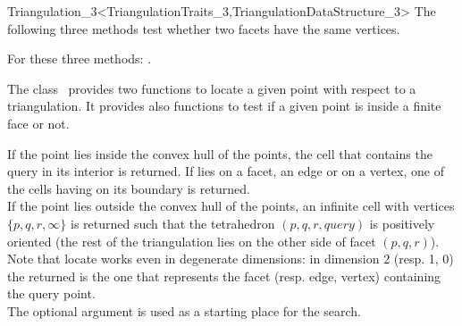 \begin{ccRefClass}{Triangulation_3<TriangulationTraits_3,TriangulationDataStructure_3>}
The following three methods test whether two facets have the same
vertices.

{}
\ccGlue
{}
{}
\ccGlue
{}
{For these three methods: .}



The class \ccClassTemplateName\  provides two functions to locate
a given point with respect to a triangulation. It provides
also functions to test if a given point is inside a finite face
or not.

{
If the point  lies inside the convex hull of the points, the cell 
that contains the query in its interior is returned. If  lies on a
facet, an edge or on a vertex, one of the cells having  on
its boundary is returned.\\ 
If the point  lies outside the convex hull of the points,
an infinite cell with vertices $\{ p, q, r, \infty\}$ is returned such that
the tetrahedron $( p, q, r, query )$ is positively oriented
(the rest of the triangulation lies on the other side of facet 
$( p, q, r )$). \\
Note that locate works even in degenerate dimensions: in dimension 2
(resp. 1, 0) the  returned is the one that represents
the facet (resp. edge, vertex) containing the query point. \\
The optional argument  is used as a starting place for the search.
}


\end{ccRefClass}
